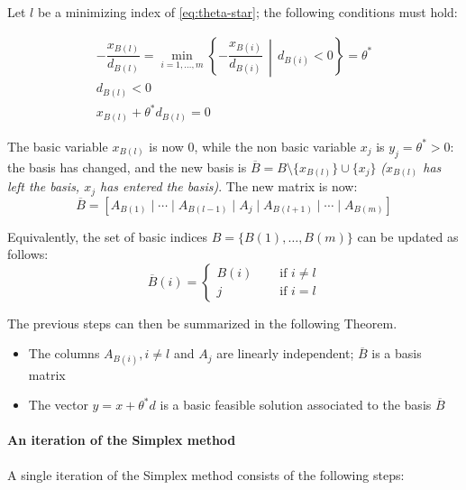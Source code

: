 \documentclass[english]{article}
\begin{document}
Let \(l\) be a minimizing index of \ref{eq:theta-star};
the following conditions must hold:

\begin{gather*}
  - \dfrac{x_{B(l)}}{d_{B(l)}} = \min_{i=1, \ldots, m} \left\{ - \dfrac{x_{B(i)}}{d_{B(i)}} \,\middle\vert\, d_{B(i)} < 0 \right\} = \theta^\ast \\
  d_{B(l)}  < 0 \\
  x_{B(l)} + \theta^\ast d_{B(l)}  = 0
\end{gather*}

The basic variable \(x_{B(l)}\) is now \(0\), while the non basic variable \(x_j\) is \(y_j = \theta^\ast > 0\):
the basis has changed, and the new basis is \(\overline{B} = B \setminus \{ x_{B(l)} \} \cup \{ x_j \}\) \textit{(\(x_{B(l)}\) has left the basis, \(x_j\) has entered the basis)}.
The new matrix is now:
\[ \overline{B} = \left[ A_{B(1)} \mid  \cdots \mid A_{B(l-1)} \mid A_j \mid A_{B(l+1)} \mid \cdots \mid A_{B(m)} \right] \]

\bigskip
Equivalently, the set of basic indices \(B = \{ B(1), \ldots, B(m) \}\) can be updated as follows:
\[\overline{B}(i) = \begin{cases}
    B(i) \quad & \text{ if } i \neq l \\
    j \quad    & \text{ if } i = l
  \end{cases}\]

\bigskip
The previous steps can then be summarized in the following Theorem.

\begin{theorem}
  \begin{itemize}
    \item The columns \(A_{B(i)}, i \neq l\) and \(A_j\) are linearly independent; \(\overline{B}\) is a basis matrix
    \item The vector \(y = x + \theta^\ast d\) is a basic feasible solution associated to the basis \(\overline{B}\)
  \end{itemize}
\end{theorem}

\paragraph{An iteration of the Simplex method}

A single iteration of the Simplex method consists of the following steps:
\end{document}
